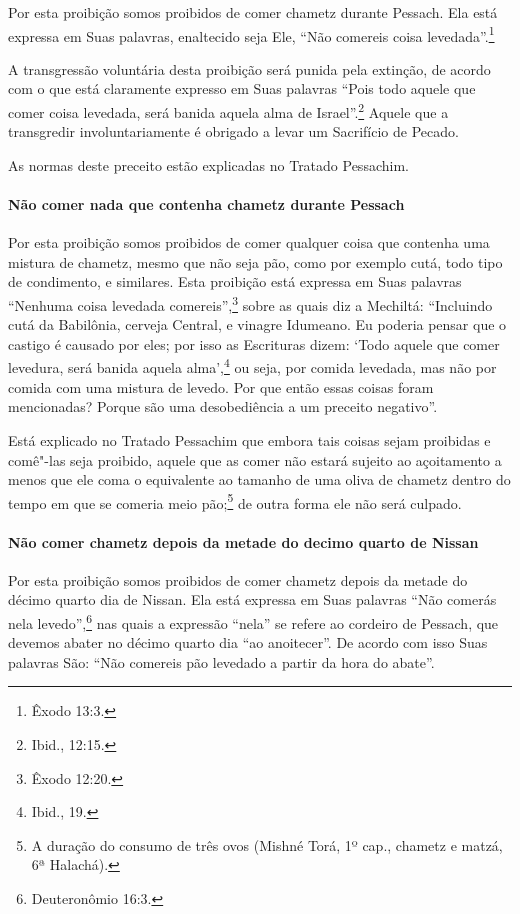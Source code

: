 \begin{multicols}{2}
Por esta proibição somos proibidos de comer chametz\starr{} durante
Pessach\starr. Ela está expressa em Suas palavras, enaltecido seja Ele,
``Não comereis coisa levedada''.\footnote{Êxodo 13:3.}

A transgressão voluntária desta proibição será punida pela extinção, de
acordo com o que está claramente expresso em Suas palavras ``Pois todo
aquele que comer coisa levedada, será banida aquela alma de Israel''.\footnote{Ibid., 12:15.} Aquele que a transgredir involuntariamente é obrigado a
levar um Sacrifício de Pecado.

As normas deste preceito estão explicadas no Tratado Pessachim\starr.

\paragraph{Não comer nada que contenha chametz\starr{} durante Pessach\starr{}}

Por esta proibição somos proibidos de comer qualquer coisa que contenha
uma mistura de chametz\starr, mesmo que não seja pão, como por exemplo
cutá\starr, todo tipo de condimento, e similares.
Esta proibição está expressa em Suas palavras ``Nenhuma coisa levedada
comereis'',\footnote{Êxodo 12:20.} sobre as quais diz a Mechiltá\starr: ``Incluindo
cutá\starr{} da Babilônia, cerveja Central, e vinagre Idumeano. Eu poderia
pensar que o castigo é causado por eles; por isso as Escrituras dizem:
`Todo aquele que comer levedura, será banida aquela alma',\footnote{Ibid., 19.}
ou seja, por comida levedada, mas não por comida com uma mistura de
levedo. Por que então essas coisas foram mencionadas? Porque são uma
desobediência a um preceito negativo''.

Está explicado no Tratado Pessachim\starr{} que embora tais coisas sejam
proibidas e comê"-las seja proibido, aquele que as comer não estará
sujeito ao açoitamento a menos que ele coma o equivalente ao tamanho de
uma oliva de chametz\starr{} dentro do tempo em que se comeria meio
pão;\footnote{A duração do consumo de três ovos (Mishné Torá\starr, 1º cap., chametz\starr{} e
  matzá\starr, 6ª Halachá\starr).} de outra forma ele não será culpado.

\paragraph{Não comer chametz\starr{} depois da metade do decimo quarto de Nissan\starr}

Por esta proibição somos proibidos de comer chametz\starr{} depois da metade
do décimo quarto dia de Nissan\starr. Ela está expressa em Suas palavras ``Não
comerás nela levedo'',\footnote{Deuteronômio 16:3.} nas quais a expressão
``nela'' se refere ao cordeiro de Pessach\starr, que devemos abater no
décimo quarto dia ``ao anoitecer''. De acordo com isso Suas palavras
São: ``Não comereis pão levedado a partir da hora do abate''.


\end{multicols}

